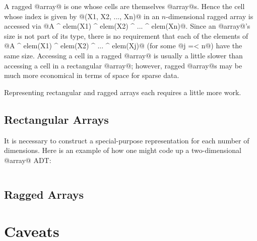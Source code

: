 A ragged @array@ is one whose cells are themselves @array@s.  Hence the
cell whose index is given by @(X1, X2, ..., Xn)@ in an $n$-dimensional
ragged array is accessed via
@A ^ elem(X1) ^ elem(X2) ^ ... ^ elem(Xn)@.  Since an @array@'s size is
not part of its type, there is no requirement that each of the elements
of @A ^ elem(X1) ^ elem(X2) ^ ... ^ elem(Xj)@ (for some @j =< n@) have
the same size.  Accessing a cell in a ragged @array@ is usually a little
slower than accessing a cell in a rectangular @array@; however, ragged
@array@s may be much more economical in terms of space for sparse data.

Representing rectangular and ragged arrays each requires a little more
work.

\subsection{Rectangular Arrays}


It is necessary to construct a special-purpose representation for each
number of dimensions.  Here is an example of how one might code up a
two-dimensional @array@ ADT:
\begin{verbatim}

\end{verbatim}

\subsection{Ragged Arrays}

\section{Caveats}


